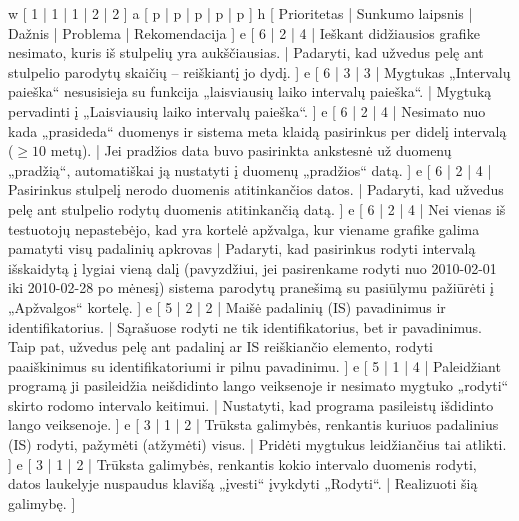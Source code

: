 \label{section:recommendations}

\xtable
{
  w [ 1 | 1 | 1 | 2 | 2 ]
  a [ p | p | p | p | p ]
  h [ Prioritetas | Sunkumo laipsnis | Dažnis | Problema | Rekomendacija ]
  e [ 6 | 2 | 4 |
    Ieškant didžiausios grafike nesimato, kuris iš stulpelių yra
    aukščiausias. |
    Padaryti, kad užvedus pelę ant stulpelio parodytų skaičių – reiškiantį
    jo dydį.
    ]
  e [ 6 | 3 | 3 |
    Mygtukas „Intervalų paieška“ nesusisieja su funkcija „laisviausių
    laiko intervalų paieška“. |
    Mygtuką pervadinti į „Laisviausių laiko intervalų paieška“.
    ]
  e [ 6 | 2 | 4 |
    Nesimato nuo kada „prasideda“ duomenys ir sistema meta klaidą 
    pasirinkus per didelį intervalą ($\geq 10$ metų). |
    Jei pradžios data buvo pasirinkta ankstesnė už duomenų „pradžią“,
    automatiškai ją nustatyti į duomenų „pradžios“ datą.
    ]
  e [ 6 | 2 | 4 |
    Pasirinkus stulpelį nerodo duomenis atitinkančios datos. |
    Padaryti, kad užvedus pelę ant stulpelio rodytų duomenis atitinkančią
    datą.
    ]
  e [ 6 | 2 | 4 |
    Nei vienas iš testuotojų nepastebėjo, kad yra kortelė apžvalga,
    kur viename grafike galima pamatyti visų padalinių apkrovas |
    Padaryti, kad pasirinkus rodyti intervalą išskaidytą į lygiai vieną
    dalį (pavyzdžiui, jei pasirenkame rodyti nuo 2010-02-01 iki
    2010-02-28 po mėnesį) sistema parodytų pranešimą su pasiūlymu
    pažiūrėti į „Apžvalgos“ kortelę.
    ]
  e [ 5 | 2 | 2 |
    Maišė padalinių (IS) pavadinimus ir identifikatorius. |
    Sąrašuose rodyti ne tik identifikatorius, bet ir pavadinimus. Taip
    pat, užvedus pelę ant padalinį ar IS reiškiančio elemento,
    rodyti paaiškinimus su identifikatoriumi ir pilnu pavadinimu.
    ]
  e [ 5 | 1 | 4 |
    Paleidžiant programą ji pasileidžia neišdidinto lango veiksenoje
    ir nesimato mygtuko „rodyti“ skirto rodomo intervalo keitimui. |
    Nustatyti, kad programa pasileistų išdidinto lango veiksenoje.
    ]
  e [ 3 | 1 | 2 |
    Trūksta galimybės, renkantis kuriuos padalinius (IS) rodyti,
    pažymėti (atžymėti) visus. |
    Pridėti mygtukus leidžiančius tai atlikti.
    ]
  e [ 3 | 1 | 2 |
    Trūksta galimybės, renkantis kokio intervalo duomenis rodyti,
    datos laukelyje nuspaudus klavišą „įvesti“ įvykdyti „Rodyti“. |
    Realizuoti šią galimybę.
    ]
}
